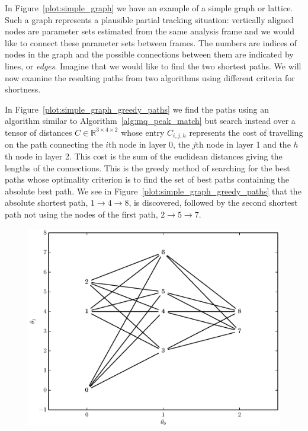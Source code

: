 In Figure~\ref{plot:simple_graph} we have an example of a simple graph or
lattice. Such a graph represents a plausible partial tracking situation:
vertically aligned nodes are parameter sets estimated from the same analysis
frame and we would like to connect these parameter sets between frames. The
numbers are indices of nodes in the graph and the possible connections between
them are indicated by lines, or \textit{edges}. Imagine that we would like to
find the two shortest paths. We will now examine the resulting paths from two
algorithms using different criteria for shortness.

In Figure~\ref{plot:simple_graph_greedy_paths} we find the paths using an
algorithm similar to Algorithm~\ref{alg:mq_peak_match} but search instead over a
tensor of distances $C \in \mathbb{R}^{3 \times 4 \times 2}$ whose entry
$C_{i,j,h}$ represents the cost of travelling on the path connecting the $i$th
node in layer 0, the $j$th node in layer 1 and the $h$th node in layer 2. This
cost is the sum of the euclidean distances giving the lengths of the
connections. This is the greedy method of searching for the best paths whose
optimality criterion is to find the set of best paths containing the absolute
best path. We see in Figure~\ref{plot:simple_graph_greedy_paths} that the
absolute shortest path, $1 \rightarrow 4 \rightarrow 8$, is discovered, followed
by the second shortest path not using the nodes of the first path, $2
\rightarrow 5 \rightarrow 7$.

\begin{figure}[!t]
    \centering
    \includegraphics[width=\figwidthscale\textwidth]{plots/small_graph_ex.eps}
    \CaptionWithTitle{%
    }{\label{plot:simple_graph}}
\end{figure}

